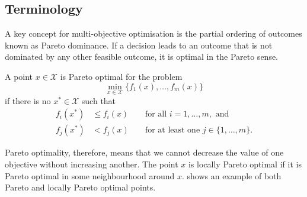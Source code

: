 \documentclass[main.tex]{subfiles}
\begin{document}
\subsection{Terminology}\label{sec:multi_terminology}
A key concept for multi-objective optimisation is the partial
ordering of outcomes known as Pareto dominance. If a decision leads to
an outcome that is not dominated by any other feasible outcome, it is
optimal in the Pareto sense.
\begin{mydef}
  A point $x\in\mathcal{X}$ is Pareto optimal for the problem
  \begin{equation}
    \min_{x\in\mathcal{X}}\{f_1(x),\dots,f_m(x)\}
  \end{equation}
  if there is no
  $x^*\in\mathcal{X}$ such that
  \begin{align}
    f_i(x^*)&\leq f_i(x) &&\text{ for all } i = 1,\dots,m, \text{ and}\\
    f_j(x^*)&<f_j(x) &&\text{ for at least one } j \in \{1,\dots,m\}.
  \end{align}
\end{mydef}
Pareto optimality, therefore, means that we cannot decrease the value of
one objective without increasing another.
The point $x$ is locally Pareto optimal if it is Pareto optimal in
some neighbourhood around $x$. 
shows an example of both Pareto and locally Pareto optimal points.
\end{document}
